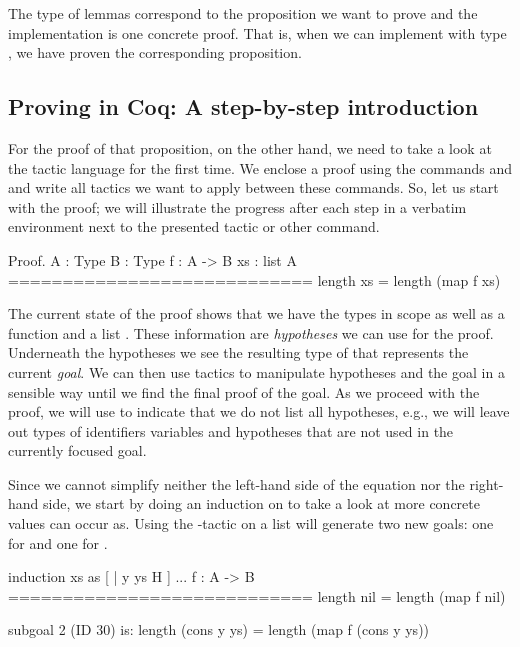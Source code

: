 The type of lemmas correspond to the proposition we want to prove and the implementation is one concrete proof.
That is, when we can implement  with type , we have proven the corresponding proposition.

\subsection{Proving in Coq: A step-by-step introduction}
For the proof of that proposition, on the other hand, we need to take a look at the tactic language  for the first time.
We enclose a proof using the commands  and  and write all tactics we want to apply between these commands.
So, let us start with the proof; we will illustrate the progress after each step in a verbatim environment next to the presented tactic or other command.

\begin{cproof}{Proof.}
  A : Type
  B : Type
  f : A -> B
  xs : list A
  ============================
  length xs = length (map f xs)
\end{cproof}

The current state of the proof shows that we have the types  in scope as well as a function  and a list .
These information are \emph{hypotheses} we can use for the proof.
Underneath the hypotheses we see the resulting type of  that represents the current \emph{goal}.
We can then use tactics to manipulate hypotheses and the goal in a sensible way until we find the final proof of the goal.
 As we proceed with the proof, we will use  to indicate that we do not list all hypotheses, e.g., we will leave out types of identifiers variables and hypotheses that are not used in the currently focused goal.

Since we cannot simplify neither the left-hand side of the equation nor the right-hand side, we start by doing an induction on  to take a look at more concrete values  can occur as.
Using the -tactic on a list will generate two new goals: one for  and one for .

\begin{cproof}{induction xs as [ | y ys H ]}
  ...
  f : A -> B
  ============================
  length nil = length (map f nil)

subgoal 2 (ID 30) is:
length (cons y ys) =
length (map f (cons y ys))
\end{cproof}

